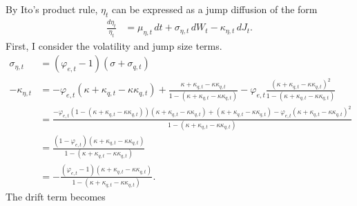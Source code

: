 \documentclass[12 pt, oneside]{article}
\theoremstyle{definition}
\theoremstyle{definition}
\theoremstyle{definition}
\begin{document}
By Ito's product rule, $\eta_t$ can be expressed as a jump diffusion of the form
\begin{align*}
  \frac{d\eta_t}{\eta_t} & = \mu_{\eta, t}\, dt + \sigma_{\eta, t}\, dW_t  - \kappa_{\eta, t}\, dJ_t.
\end{align*}
First, I consider the volatility and jump size terms.
\begin{align*}
  \sigma_{\eta, t} & = (\varphi_{e, t} - 1)(\sigma + \sigma_{q, t})\\
-  \kappa_{\eta, t} & = -\varphi_{e, t}(\kappa + \kappa_{q, t} - \kappa\kappa_{q, t}) + \frac{\kappa + \kappa_{q, t} - \kappa\kappa_{q, t}}{1 - (\kappa + \kappa_{q, t} - \kappa\kappa_{q, t})} - \varphi_{e, t}\frac{(\kappa + \kappa_{q, t} - \kappa\kappa_{q, t})^2}{1 - (\kappa + \kappa_{q, t} - \kappa\kappa_{q, t})}\\
                   & = \frac{-\varphi_{e, t}(1 - (\kappa + \kappa_{q, t} - \kappa\kappa_{q, t})) (\kappa + \kappa_{q, t} - \kappa\kappa_{q, t}) +(\kappa + \kappa_{q, t} - \kappa\kappa_{q, t}) - \varphi_{e, t}(\kappa + \kappa_{q, t} - \kappa\kappa_{q, t})^2}{1 - (\kappa + \kappa_{q, t} - \kappa\kappa_{q, t})}\\
                   & =  \frac{(1 - \varphi_{e, t})(\kappa + \kappa_{q, t} - \kappa\kappa_{q, t})}{1 - (\kappa + \kappa_{q, t} - \kappa\kappa_{q, t})}\\
                   & =  -\frac{(\varphi_{e, t} - 1)(\kappa + \kappa_{q, t} - \kappa\kappa_{q, t})}{1 - (\kappa + \kappa_{q, t} - \kappa\kappa_{q, t})}.
\end{align*}
The drift term becomes
\end{document}
